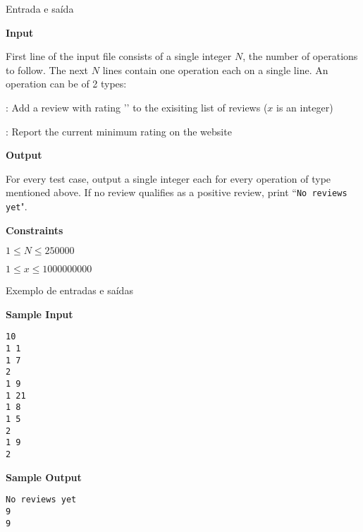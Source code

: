 \begin{frame}[fragile]{Entrada e saída}

\textbf{Input}

First line of the input file consists of a single integer $N$, the number of operations to follow. 
The next $N$ lines contain one operation each on a single line. An operation can be of 2 types:

 : Add a review with rating '' to the exisiting list of reviews ($x$ is an integer)

 : Report the current minimum rating on the website

\textbf{Output}

For every test case, output a single integer each for every operation of type  mentioned above. If no review qualifies as a positive review, print ``\texttt{No reviews yet}".

\textbf{Constraints}

$1 \leq N \leq 250000$

$1 \leq x \leq 1000000000$
\end{frame}

\begin{frame}[fragile]{Exemplo de entradas e saídas}

\begin{minipage}[t]{0.5\textwidth}
\textbf{Sample Input}
\begin{verbatim}
10
1 1
1 7
2
1 9
1 21
1 8
1 5
2
1 9
2
\end{verbatim}
\end{minipage}
\begin{minipage}[t]{0.45\textwidth}
\textbf{Sample Output}
\begin{verbatim}
No reviews yet
9
9
\end{verbatim}
\end{minipage}
\end{frame}

